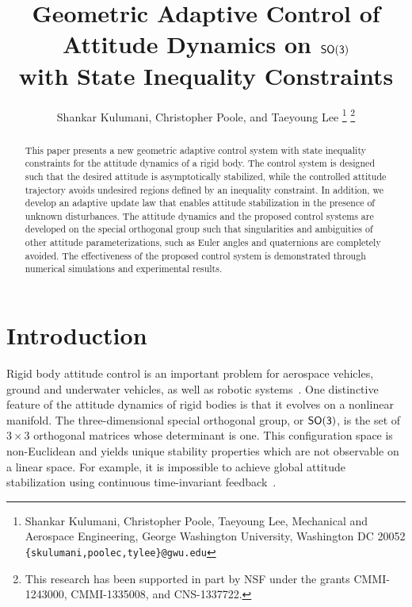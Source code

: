 \documentclass[letterpaper, 10 pt, conference]{ieeeconf}  %
\title{\LARGE \bf
Geometric Adaptive Control of Attitude Dynamics on $\mathsf{SO(3)}$\\ with State Inequality Constraints}
\author{Shankar Kulumani, Christopher Poole, and Taeyoung Lee
\thanks{Shankar Kulumani, Christopher Poole, Taeyoung Lee, Mechanical and Aerospace Engineering, George Washington University, Washington DC 20052 {\tt \{skulumani,poolec,tylee\}@gwu.edu}}
\thanks{This research has been supported in part by NSF under the grants CMMI-1243000, CMMI-1335008, and CNS-1337722.}
}
\begin{document}
\allowdisplaybreaks

\maketitle
\thispagestyle{empty}
\pagestyle{empty}


\begin{abstract}
This paper presents a new geometric adaptive control system with state inequality constraints for the attitude dynamics of a rigid body. 
The control system is designed such that the desired attitude is asymptotically stabilized, while the controlled attitude trajectory avoids undesired regions defined by an inequality constraint. 
In addition, we develop an adaptive update law that enables attitude stabilization in the presence of unknown disturbances. 
The attitude dynamics and the proposed control systems are developed on the special orthogonal group such that singularities and ambiguities of other attitude parameterizations, such as Euler angles and quaternions are completely avoided. 
The effectiveness of the proposed control system is demonstrated through numerical simulations and experimental results.
\end{abstract}


\section{Introduction}\label{sec:intro}

Rigid body attitude control is an important problem for aerospace vehicles, ground and underwater vehicles, as well as robotic systems~\cite{hughes2004}.
One distinctive feature of the attitude dynamics of rigid bodies is that it evolves on a nonlinear manifold.
The three-dimensional special orthogonal group, or \( \mathsf{SO(3)} \), is the set of \( 3 \times 3 \) orthogonal matrices whose determinant is one.
This configuration space is non-Euclidean and yields unique stability properties which are not observable on a linear space.
For example, it is impossible to achieve global attitude stabilization using continuous time-invariant feedback~\cite{bhat2000}.
\end{document}
